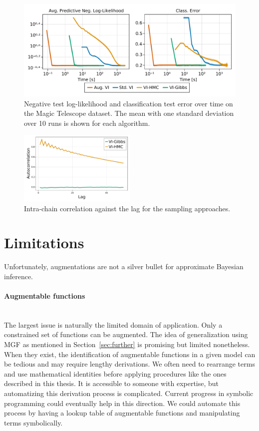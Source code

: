 \begin{figure}[H]
    \centering
    \includegraphics[width=\textwidth]{./chapters/8_discussions/figures/magictelescope.pdf}
    \caption{Negative test log-likelihood and classification test error over time on the Magic Telescope dataset.
    The mean with one standard deviation over 10 runs is shown for each algorithm.
    }
    \label{fig:magictelescope}
\end{figure}

\begin{figure}[H]
    \centering
    \includegraphics[width=0.5\textwidth]{./chapters/8_discussions/figures/magictelescope_autocor.pdf}
    \caption{Intra-chain correlation against the lag for the sampling approaches.}
    \label{fig:magictelescope_autocor}
\end{figure}

\section{Limitations}

Unfortunately, augmentations are not a silver bullet for approximate Bayesian inference.
\paragraph[]{Augmentable functions}\mbox{}\\
The largest issue is naturally the limited domain of application. 
Only a constrained set of functions can be augmented.
The idea of generalization using \ac{MGF} as mentioned in Section~\ref{sec:further} is promising but limited nonetheless.
When they exist, the identification of augmentable functions in a given model can be tedious and may require lengthy derivations.
We often need to rearrange terms and use mathematical identities before applying procedures like the ones described in this thesis.
It is accessible to someone with expertise, but automatizing this derivation process is complicated.
Current progress in symbolic programming could eventually help in this direction.
We could automate this process by having a lookup table of augmentable functions and manipulating terms symbolically.

